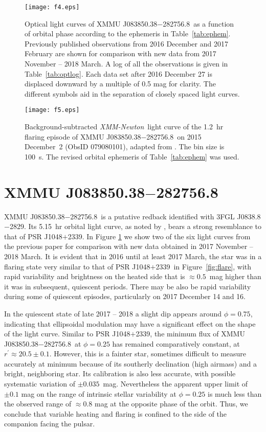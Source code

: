 \documentclass[iop]{emulateapj}
\newcommand{\xmm}{{\it XMM-Newton}}
\newcommand{\msptwo}{PSR J1048$+$2339}
\newcommand{\mspthree}{XMMU J083850.38$-$282756.8}
\newcommand{\fgl}{3FGL J0838.8$-$2829}
\begin{document}
\begin{figure}
\centerline{
\texttt{[image: f4.eps]}
}
\caption{Optical light curves of \mspthree\ 
as a function of orbital phase according to the ephemeris
in Table~\ref{tab:ephem}.   Previously published observations
from 2016 December and 2017 February are shown for comparison
with new data from 2017 November -- 2018 March.
A log of all the observations is
given in Table~\ref{tab:optlog}.  Each data set after 2016 December 27
is displaced downward by a multiple of 0.5 mag for clarity.
The different symbols aid in the separation of
closely spaced light curves.
}
\label{fig:optical_phase}
\end{figure}

\begin{figure}
\texttt{[image: f5.eps]}
\caption{Background-subtracted \xmm\ light curve of the 1.2~hr
 flaring episode of \mspthree\ on 2015 December~2 (ObsID 079080101),
 adapted from \citet{hal17b}.  The bin size is 100~s.  The revised
 orbital ephemeris of Table~\ref{tab:ephem} was used.}
\label{fig:xray_phase_fig.ps}
\end{figure}

\section{\mspthree}

\mspthree\ is a putative redback identified with \fgl.
Its 5.15~hr orbital light curve, as noted by \citet{hal17b},
bears a strong resemblance to that of \msptwo.  In
Figure \ref{fig:optical_phase} we show two of the six
light curves from the previous paper for comparison with
new data obtained in 2017 November -- 2018 March.
It is evident that in 2016 until at least 2017 March,
the star was in a flaring state very similar to that of \msptwo\
in Figure~\ref{fig:flare}, with rapid variability and brightness
on the heated side that is $\approx0.5$~mag higher than it was in
subsequent, quiescent periods.
There may be also be rapid variability during some of
quiescent episodes, particularly on 2017 December 14 and 16.

In the quiescent state of late 2017 -- 2018 a slight dip appears
around $\phi=0.75$, indicating that ellipsoidal
modulation may have a significant effect on the
shape of the light curve.
Similar to \msptwo, the minimum flux of \mspthree\
at $\phi=0.25$ has remained comparatively constant, at
$r^{\prime}\approx20.5\pm0.1$.  However, this is a fainter star,
sometimes difficult to measure accurately at minimum
because of its southerly declination (high airmass) and a bright,
neighboring star.  Its calibration is also less accurate,
with possible systematic variation of $\pm0.035$~mag.
Nevertheless the apparent upper limit of $\pm0.1$ mag
on the range of intrinsic stellar variability at $\phi=0.25$ 
is much less than the observed range of $\approx0.8$ mag
at the opposite phase of the orbit.
Thus, we conclude that variable heating and flaring is
confined to the side of the companion facing the pulsar.
\end{document}
